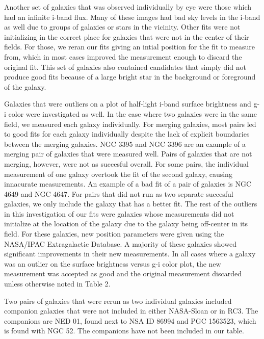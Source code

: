 \documentclass[12pt,preprint,pdftex]{aastex}
\begin{document}
Another set of galaxies that was observed individually by eye were those which had an infinite i-band flux. Many of these images had bad sky levels in the i-band as well due to groups of galaxies or stars in the vicinity. Other fits were not initializing in the correct place for galaxies that were not in the center of their fields. For those, we reran our fits giving an intial position for the fit to measure from, which in most cases improved the measurement enough to discard the original fit. This set of galaxies also contained candidates that simply did not produce good fits because of a large bright star in the background or foreground of the galaxy.

Galaxies that were outliers on a plot of half-light i-band surface brightness and g-i color were investigated as well. In the case where two galaxies were in the same field, we measured each galaxy individually. For merging galaxies, most pairs led to good fits for each galaxy individually despite the lack of explicit boundaries between the merging galaxies. NGC 3395 and NGC 3396 are an example of a merging pair of galaxies that were measured well. Pairs of galaxies that are not merging, however, were not as succesful overall. For some pairs, the individual measurement of one galaxy overtook the fit of the second galaxy, causing innacurate measurements. An example of a bad fit of a pair of galaxies is NGC 4649 and NGC 4647. For pairs that did not run as two separate succesful galaxies, we only include the galaxy that has a better fit. The rest of the outliers in this investigation of our fits were galaxies whose measurements did not initialize at the location of the galaxy due to the galaxy being off-center in its field. For these galaxies, new position parameters were given using the NASA/IPAC Extragalactic Database. A majority of these galaxies showed significant improvements in their new measurements. In all cases where a galaxy was an outlier on the surface brightness versus g-i color plot, the new measurement was accepted as good and the original measurement discarded unless otherwise noted in Table 2.

Two pairs of galaxies that were rerun as two individual galaxies included companion galaxies that were not included in either NASA-Sloan or in RC3. The companions are NED 01, found next to NSA ID 86994 and PGC 1563523, which is found with NGC 52. The companions have not been included in our table. 
\end{document}
